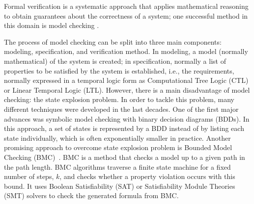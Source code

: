 \documentclass[runningheads]{llncs}
\begin{document}
Formal verification is a systematic approach that applies mathematical reasoning to obtain guarantees about the correctness of a system; one successful method in this domain is model checking \cite{Clarke2012}.

% 
%
The process of model checking can be split into three main components: modeling, specification, and verification method. In modeling, a model (normally mathematical) of the system is created; in specification, normally a list of properties to be satisfied by the system is established, i.e., the requirements, normally  expressed in a temporal logic form as Computational Tree Logic (CTL) or Linear Temporal Logic (LTL).
%
%
However, there is a main disadvantage of model checking: the state explosion problem. In order to tackle this problem, many different techniques were developed in the last decades. One of the first major advances was symbolic model checking with binary decision diagrams (BDDs). In this approach, a set of states is represented by a BDD instead of by listing each state individually, which is often exponentially smaller in practice.
%
Another promising approach to overcome state explosion problem is Bounded Model Checking (BMC)~\cite{DBLP:conf/tacas/BiereCCZ99}. BMC is a method that checks a model up to a given path in the path length. BMC algorithms traverse a finite state machine for a fixed number of steps, $ k $, and checks whether a property violation occurs with this bound. It uses Boolean Satisfiability (SAT) or Satisfiability Module Theories (SMT) solvers to check the generated formula from BMC. 
\end{document}
